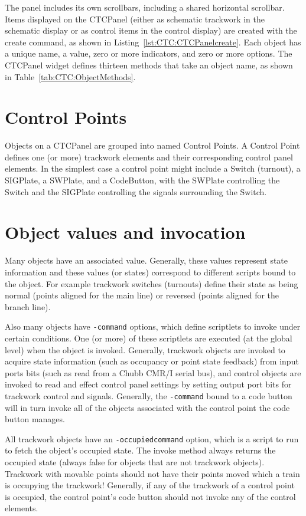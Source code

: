 The panel includes its own scrollbars, including a shared horizontal
scrollbar. Items displayed on the CTCPanel (either as schematic
trackwork in the schematic display or as control items in the control
display) are created with the create command, as shown in
Listing~\ref{lst:CTC:CTCPanelcreate}.  Each object has a unique name, a
value, zero or more indicators, and zero or more options.  The CTCPanel
widget defines thirteen methods that take an object name, as shown in
Table~\ref{tab:CTC:ObjectMethods}. 

\section{Control Points}

Objects on a CTCPanel are grouped into named Control Points.  A Control
Point defines one (or more) trackwork elements and their corresponding
control panel elements.  In the simplest case a control point might
include a Switch (turnout), a SIGPlate, a SWPlate, and a CodeButton,
with the SWPlate controlling the Switch and the SIGPlate controlling the
signals surrounding the Switch.

\section{Object values and invocation}

Many objects have an associated value.  Generally, these values
represent state information and these values (or states) correspond to
different scripts bound to the object.  For example trackwork switches
(turnouts) define their state as being normal (points aligned for the
main line) or reversed (points aligned for the branch line).

Also many objects have \lstinline=-command= options, which define
scriptlets to invoke under certain conditions.  One (or more) of these
scriptlets are executed (at the global level) when the object is
invoked.  Generally, trackwork objects are invoked to acquire state
information (such as occupancy or point state feedback) from input
ports bits (such as read from a Chubb CMR/I serial bus), and control
objects are invoked to read and effect control panel settings by
setting output port bits for trackwork control and signals.  Generally,
the \lstinline=-command= bound to a code button will in turn invoke all
of the objects associated with the control point the code button
manages.

All trackwork objects have an \lstinline=-occupiedcommand= option,
which is a script to run to fetch the object's occupied state.  The
invoke method always returns the occupied state (always false for
objects that are not trackwork objects).  Trackwork with movable points
should not have their points moved which a train is occupying the
trackwork!  Generally, if any of the trackwork of a control point is
occupied, the control point's code button should not invoke any of the
control elements.

